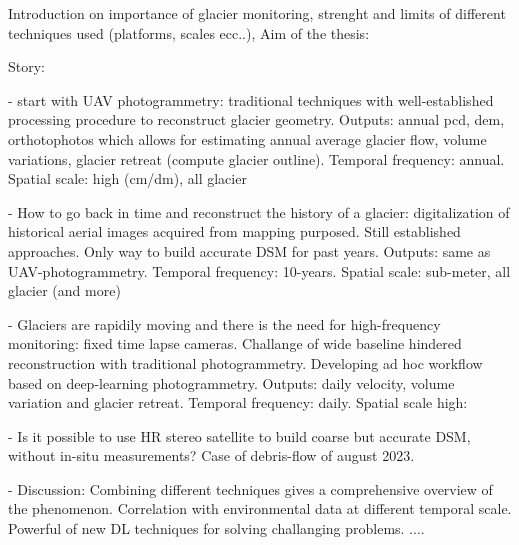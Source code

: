 \documentclass[12pt]{article}
\begin{document}
Introduction on importance of glacier monitoring, strenght and limits of different
techniques used (platforms, scales ecc..),
Aim of the thesis:

Story:

- start with UAV photogrammetry: traditional techniques with well-established processing
procedure to reconstruct glacier geometry.
Outputs: annual pcd, dem, orthotophotos which allows for estimating annual average
glacier flow, volume variations, glacier retreat (compute glacier outline).
Temporal frequency: annual. Spatial scale: high (cm/dm), all glacier

- How to go back in time and reconstruct the history of a glacier: digitalization of
historical aerial images acquired from mapping purposed. Still established approaches.
Only way to build accurate DSM for past years.
Outputs: same as UAV-photogrammetry. Temporal frequency: 10-years. Spatial scale:
sub-meter, all glacier (and more)

- Glaciers are rapidily moving and there is the need for high-frequency monitoring: fixed
time lapse cameras. Challange of wide baseline hindered reconstruction with traditional
photogrammetry. Developing ad hoc workflow based on deep-learning photogrammetry.
Outputs: daily velocity, volume variation and glacier retreat. Temporal frequency: daily.
Spatial scale high:

- Is it possible to use HR stereo satellite to build coarse but accurate DSM, without
in-situ measurements?
Case of debris-flow of august 2023.

- Discussion:
Combining different techniques gives a comprehensive overview of the phenomenon.
Correlation with environmental data at different temporal scale.
Powerful of new DL techniques for solving challanging problems.
....
\end{document}
